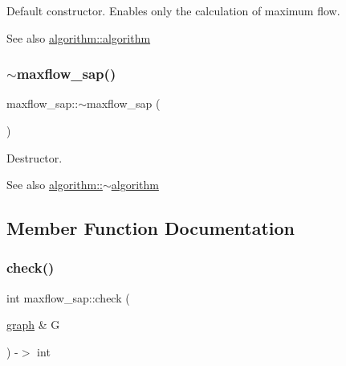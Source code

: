 Default constructor. Enables only the calculation of maximum flow.

\begin{DoxySeeAlso}{See also}
\mbox{\hyperlink{classalgorithm_ab79e1ddec2f2afdf4b36b10724db8b15}{algorithm\+::algorithm}} 
\end{DoxySeeAlso}
\mbox{\label{classmaxflow__sap_ab49914afde43ffa0e5c3049cc063a8d2}} 
\subsubsection{\texorpdfstring{$\sim$maxflow\+\_\+sap()}{~maxflow\_sap()}}
{\footnotesize\ttfamily maxflow\+\_\+sap\+::$\sim$maxflow\+\_\+sap (\begin{DoxyParamCaption}{ }\end{DoxyParamCaption})\hspace{0.3cm}{\ttfamily [virtual]}}

Destructor.

\begin{DoxySeeAlso}{See also}
\mbox{\hyperlink{classalgorithm_adca9b1e7fa3afd914519a9dbb44e9fd5}{algorithm\+::$\sim$algorithm}} 
\end{DoxySeeAlso}


\subsection{Member Function Documentation}
\mbox{\label{classmaxflow__sap_acc6035b666d6db078ef1442ac847bd74}} 
\subsubsection{\texorpdfstring{check()}{check()}}
{\footnotesize\ttfamily int maxflow\+\_\+sap\+::check (\begin{DoxyParamCaption}\item[{\mbox{\hyperlink{classgraph}{graph}} \&}]{G }\end{DoxyParamCaption}) -\/$>$ int\hspace{0.3cm}{\ttfamily [virtual]}}

